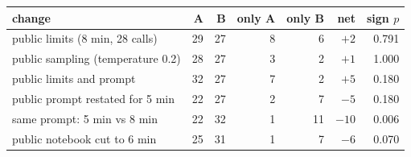 \begin{tabular}{lrrrrrr}
\toprule
change & A & B & only A & only B & net & sign $p$ \\
\midrule
public limits (8 min, 28 calls) & 29 & 27 & 8 & 6 & $+2$ & 0.791 \\
public sampling (temperature 0.2) & 28 & 27 & 3 & 2 & $+1$ & 1.000 \\
public limits and prompt & 32 & 27 & 7 & 2 & $+5$ & 0.180 \\
public prompt restated for 5 min & 22 & 27 & 2 & 7 & $-5$ & 0.180 \\
\quad same prompt: 5 min vs 8 min & 22 & 32 & 1 & 11 & $-10$ & 0.006 \\
public notebook cut to 6 min & 25 & 31 & 1 & 7 & $-6$ & 0.070 \\
\bottomrule
\end{tabular}

